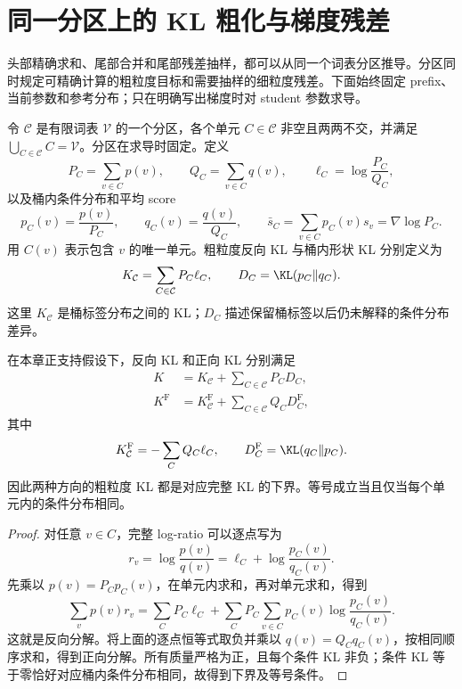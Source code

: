 \section{同一分区上的 KL 粗化与梯度残差}
\label{sec:kl-partition-geometry}
\label{sec:kl-partition}

头部精确求和、尾部合并和尾部残差抽样，都可以从同一个词表分区推导。分区同时规定可精确计算的粗粒度目标和需要抽样的细粒度残差。下面始终固定 prefix、当前参数和参考分布；只在明确写出梯度时对 student 参数求导。

\begin{definition}[词表分区与桶内分布]
令 $\mathcal C$ 是有限词表 $\mathcal V$ 的一个分区，各个单元 $C\in\mathcal C$ 非空且两两不交，并满足 $\bigcup_{C\in\mathcal C}C=\mathcal V$。分区在求导时固定。定义
\[
 P_C=\sum_{v\in C}p(v),\qquad
 Q_C=\sum_{v\in C}q(v),\qquad
 \ell_C=\log\frac{P_C}{Q_C},
\]
以及桶内条件分布和平均 score
\[
 p_C(v)=\frac{p(v)}{P_C},\qquad
 q_C(v)=\frac{q(v)}{Q_C},\qquad
 \bar s_C=\sum_{v\in C}p_C(v)s_v=\nabla\log P_C.
\]
用 $C(v)$ 表示包含 $v$ 的唯一单元。粗粒度反向 KL 与桶内形状 KL 分别定义为
\[
 K_{\mathcal C}=\sum_{C\in\mathcal C}P_C\ell_C,
 \qquad D_C=\KL(p_C\Vert q_C).
\]
这里 $K_{\mathcal C}$ 是桶标签分布之间的 KL；$D_C$ 描述保留桶标签以后仍未解释的条件分布差异。
\end{definition}

\begin{theorem}
\label{thm:kl-partition-chain}
在本章正支持假设下，反向 KL 和正向 KL 分别满足
\begin{align}
 K&=K_{\mathcal C}+\sum_{C\in\mathcal C}P_CD_C,
 \label{eq:kl-partition-chain-reverse}\\
 K^{\mathrm F}&=K^{\mathrm F}_{\mathcal C}
       +\sum_{C\in\mathcal C}Q_CD^{\mathrm F}_C,
 \label{eq:kl-partition-chain-forward}
\end{align}
其中
\[
 K^{\mathrm F}_{\mathcal C}=-\sum_CQ_C\ell_C,
 \qquad D_C^{\mathrm F}=\KL(q_C\Vert p_C).
\]
因此两种方向的粗粒度 KL 都是对应完整 KL 的下界。等号成立当且仅当每个单元内的条件分布相同。
\end{theorem}

\begin{proof}
对任意 $v\in C$，完整 log-ratio 可以逐点写为
\[
 r_v=\log\frac{p(v)}{q(v)}
     =\ell_C+\log\frac{p_C(v)}{q_C(v)}.
\]
先乘以 $p(v)=P_Cp_C(v)$，在单元内求和，再对单元求和，得到
\[
 \sum_vp(v)r_v
 =\sum_CP_C\ell_C
  +\sum_CP_C\sum_{v\in C}p_C(v)
                        \log\frac{p_C(v)}{q_C(v)}.
\]
这就是反向分解。将上面的逐点恒等式取负并乘以 $q(v)=Q_Cq_C(v)$，按相同顺序求和，得到正向分解。所有质量严格为正，且每个条件 KL 非负；条件 KL 等于零恰好对应桶内条件分布相同，故得到下界及等号条件。
\end{proof}

